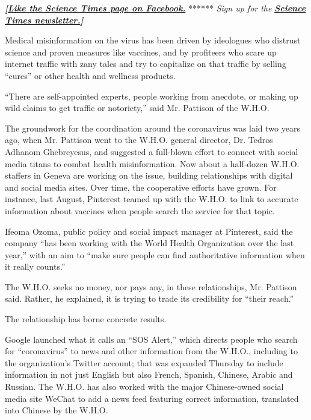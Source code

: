 \textbf{\emph{{[}}\href{https://web.archive.org/web/20200206210009/http://on.fb.me/1paTQ1h}{\emph{Like
the Science Times page on Facebook.}}} ****** \emph{\textbar{} Sign up
for the}
\textbf{\href{https://web.archive.org/web/20200206210009/http://nyti.ms/1MbHaRU}{\emph{Science
Times newsletter.}}\emph{{]}}}

Medical misinformation on the virus has been driven by ideologues who
distrust science and proven measures like vaccines, and by profiteers
who scare up internet traffic with zany tales and try to capitalize on
that traffic by selling ``cures'' or other health and wellness products.

``There are self-appointed experts, people working from anecdote, or
making up wild claims to get traffic or notoriety,'' said Mr. Pattison
of the W.H.O.

The groundwork for the coordination around the coronavirus was laid two
years ago, when Mr. Pattison went to the W.H.O. general director, Dr.
Tedros Adhanom Ghebreyesus, and suggested a full-blown effort to connect
with social media titans to combat health misinformation. Now about a
half-dozen W.H.O. staffers in Geneva are working on the issue, building
relationships with digital and social media sites. Over time, the
cooperative efforts have grown. For instance, last August, Pinterest
teamed up with the W.H.O. to link to accurate information about vaccines
when people search the service for that topic.

Ifeoma Ozoma, public policy and social impact manager at Pinterest, said
the company ``has been working with the World Health Organization over
the last year,'' with an aim to ``make sure people can find
authoritative information when it really counts.''

The W.H.O. seeks no money, nor pays any, in these relationships, Mr.
Pattison said. Rather, he explained, it is trying to trade its
credibility for ``their reach.''

The relationship has borne concrete results.

Google launched what it calls an ``SOS Alert,'' which directs people who
search for ``coronavirus'' to news and other information from the
W.H.O., including to the organization's Twitter account; that was
expanded Thursday to include information in not just English but also
French, Spanish, Chinese, Arabic and Russian. The W.H.O. has also worked
with the major Chinese-owned social media site WeChat to add a news feed
featuring correct information, translated into Chinese by the W.H.O.

